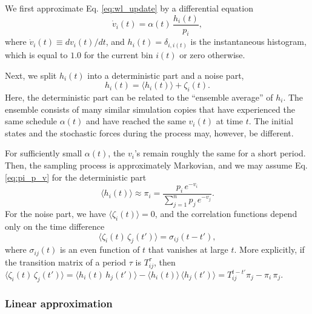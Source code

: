 \documentclass[reprint]{revtex4-1}
\begin{document}
We first approximate Eq. \eqref{eq:wl_update}
by a differential equation
%
\begin{equation}
  \dot v_i(t)
  =
  \alpha(t) \, \frac{ h_i(t) } { p_i },
  \label{eq:vt_diffeq}
\end{equation}
%
where
$\dot v_i(t) \equiv dv_i(t)/dt$,
%
and $h_i(t) = \delta_{i, i(t)}$
is the instantaneous histogram,
which is equal to $1.0$
for the current bin $i(t)$
or zero otherwise.



Next, we split $h_i(t)$ into a deterministic part
and a noise part,
%
\begin{equation}
  h_i(t) = \langle h_i(t) \rangle + \zeta_i(t).
  \label{eq:h_split}
\end{equation}
%
Here, the deterministic part can be related
to the ``ensemble average'' of $h_i$.
%
The ensemble consists of many similar simulation copies
that have experienced the same schedule $\alpha(t)$
and have reached the same $v_i(t)$
at time $t$.
%
The initial states and the stochastic forces
during the process may, however, be different.



For sufficiently small $\alpha(t)$,
the $v_i$'s remain roughly the same for a short period.
%
Then,
the sampling process is approximately Markovian, %
and we may assume Eq. \eqref{eq:pi_p_v}
for the deterministic part
%
\begin{equation}
  \langle h_i(t) \rangle
  \approx
  \pi_i
  =
  \frac{ p_i \, e^{-v_i} }
  { \sum_{j = 1}^n p_j \, e^{-v_j} }.
  \label{eq:h_ave}
\end{equation}
%
%
%
For the noise part, we have
$\langle \zeta_i(t) \rangle = 0$,
%
and the correlation functions
depend only on the time difference
%
\begin{equation}
  \langle \zeta_i(t) \, \zeta_j(t') \rangle
  =
  \sigma_{ij}(t - t'),
  \label{eq:zeta_zeta_correlation}
\end{equation}
%
where $\sigma_{ij}(t)$ is an even function of $t$
that vanishes at large $t$.
%
More explicitly,
if the transition matrix of a period $\tau$
is $T^\tau_{ij}$,
then
$
  \langle \zeta_i(t) \, \zeta_j(t') \rangle
  =
  \langle h_i(t) \, h_j(t') \rangle
  -
  \langle h_i(t) \rangle \, \langle h_j(t') \rangle
  =
  T^{t - t'}_{ij} \pi_j - \pi_i \, \pi_j.
$




\subsubsection{Linear approximation}
\end{document}
